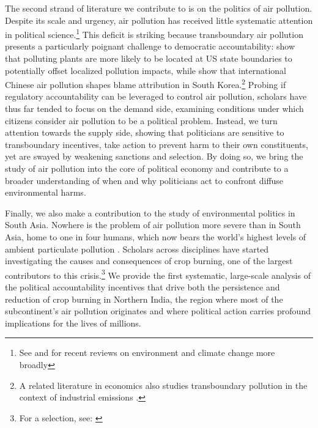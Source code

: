 \documentclass[12pt]{article}
\begin{document}
The second strand of literature we contribute to is on the politics of air pollution. Despite its scale and urgency, air pollution has received little systematic attention in political science.\footnote{See \citet{bar_gulzar2025} and \citet{grossman2026politics} for recent reviews on environment and climate change more broadly} This deficit is striking because transboundary air pollution presents a particularly poignant challenge to democratic accountability: \citet{monogan2017gone} show that polluting plants are more likely to be located at US state boundaries to potentially offset localized pollution impacts, while \citet{LeeVoeten2023} show that international Chinese air pollution shapes blame attribution in South Korea.\footnote{A related literature in economics also studies transboundary pollution in the context of industrial emissions \citep{sigman2002international, kahn2015water, lipscomb2016decentralization}.} Probing if regulatory accountability can be leveraged to control air pollution, scholars have thus far tended to focus on the demand side, examining conditions under which citizens consider air pollution to be a political problem. Instead, we turn attention towards the supply side, showing that politicians are sensitive to transboundary incentives, take action to prevent harm to their own constituents, yet are swayed by weakening sanctions and selection. By doing so, we bring the study of air pollution into the core of political economy and contribute to a broader understanding of when and why politicians act to confront diffuse environmental harms.


Finally, we also make a contribution to the study of environmental politics in South Asia. Nowhere is the problem of air pollution more severe than in South Asia, home to one in four humans, which now bears the world’s highest levels of ambient particulate pollution \citep{pullabhotla2023global}. Scholars across disciplines have started investigating the causes and consequences of crop burning, one of the largest contributors to this crisis.\footnote{For a selection, see: \citet{shyamsundar2019fields, dipoppa2024bureaucrat, garg2023, singh_thachil_2023_airpollution, jack2022money, bhuvaneshwari2019crop}} We provide the first systematic, large-scale analysis of the political accountability incentives that drive both the persistence and reduction of crop burning in Northern India, the region where most of the subcontinent’s air pollution originates and where political action carries profound implications for the lives of millions.
\end{document}
